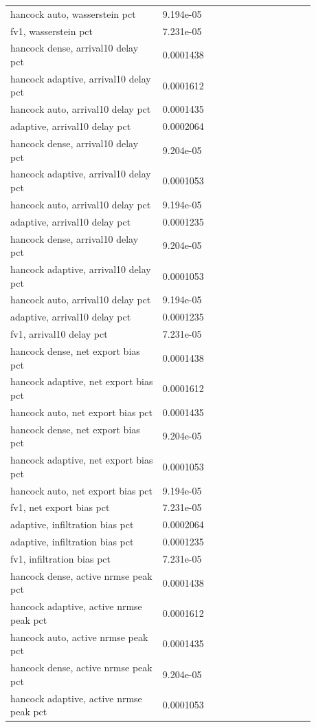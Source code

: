 \begin{longtable}{p{0.4400\linewidth}p{0.4400\linewidth}}
hancock auto, wasserstein pct & 9.194e-05 \\
fv1, wasserstein pct & 7.231e-05 \\
hancock dense, arrival10 delay pct & 0.0001438 \\
hancock adaptive, arrival10 delay pct & 0.0001612 \\
hancock auto, arrival10 delay pct & 0.0001435 \\
adaptive, arrival10 delay pct & 0.0002064 \\
hancock dense, arrival10 delay pct & 9.204e-05 \\
hancock adaptive, arrival10 delay pct & 0.0001053 \\
hancock auto, arrival10 delay pct & 9.194e-05 \\
adaptive, arrival10 delay pct & 0.0001235 \\
hancock dense, arrival10 delay pct & 9.204e-05 \\
hancock adaptive, arrival10 delay pct & 0.0001053 \\
hancock auto, arrival10 delay pct & 9.194e-05 \\
adaptive, arrival10 delay pct & 0.0001235 \\
fv1, arrival10 delay pct & 7.231e-05 \\
hancock dense, net export bias pct & 0.0001438 \\
hancock adaptive, net export bias pct & 0.0001612 \\
hancock auto, net export bias pct & 0.0001435 \\
hancock dense, net export bias pct & 9.204e-05 \\
hancock adaptive, net export bias pct & 0.0001053 \\
hancock auto, net export bias pct & 9.194e-05 \\
fv1, net export bias pct & 7.231e-05 \\
adaptive, infiltration bias pct & 0.0002064 \\
adaptive, infiltration bias pct & 0.0001235 \\
fv1, infiltration bias pct & 7.231e-05 \\
hancock dense, active nrmse peak pct & 0.0001438 \\
hancock adaptive, active nrmse peak pct & 0.0001612 \\
hancock auto, active nrmse peak pct & 0.0001435 \\
hancock dense, active nrmse peak pct & 9.204e-05 \\
hancock adaptive, active nrmse peak pct & 0.0001053 \\

\end{longtable}
